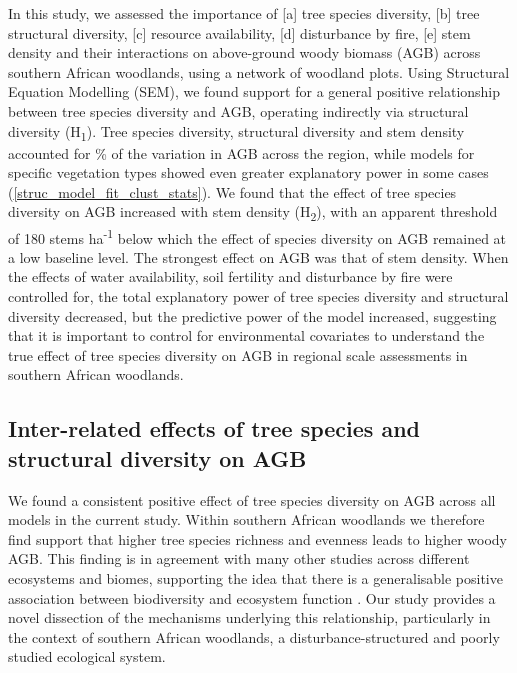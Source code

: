 \documentclass[11pt,a4paper]{article}
\begin{document}
In this study, we assessed the importance of [a] tree species diversity, [b] tree structural diversity, [c] resource availability, [d] disturbance by fire, [e] stem density and their interactions on above-ground woody biomass (AGB) across southern African woodlands, using a network of \nplots{} woodland plots. Using Structural Equation Modelling (SEM), we found support for a general positive relationship between tree species diversity and AGB, operating indirectly via structural diversity (H\textsubscript{1}). Tree species diversity, structural diversity and stem density accounted for \smrsq{}\% of the variation in AGB across the region, while models for specific vegetation types showed even greater explanatory power in some cases (\autoref{struc_model_fit_clust_stats}). We found that the effect of tree species diversity on AGB increased with stem density (H\textsubscript{2}), with an apparent threshold of 180 stems ha\textsuperscript{-1} below which the effect of species diversity on AGB remained at a low baseline level. The strongest effect on AGB was that of stem density. When the effects of water availability, soil fertility and disturbance by fire were controlled for, the total explanatory power of tree species diversity and structural diversity decreased, but the predictive power of the model increased, suggesting that it is important to control for environmental covariates to understand the true effect of tree species diversity on AGB in regional scale assessments in southern African woodlands.

\subsection{Inter-related effects of tree species and structural diversity on AGB}

% 
We found a consistent positive effect of tree species diversity on AGB across all models in the current study. Within southern African woodlands we therefore find support that higher tree species richness and evenness leads to higher woody AGB. This finding is in agreement with many other studies across different ecosystems and biomes, supporting the idea that there is a generalisable positive association between biodiversity and ecosystem function \citep{Liang2016, Cardinale2009}. Our study provides a novel dissection of the mechanisms underlying this relationship, particularly in the context of southern African woodlands, a disturbance-structured and poorly studied ecological system.
\end{document}
